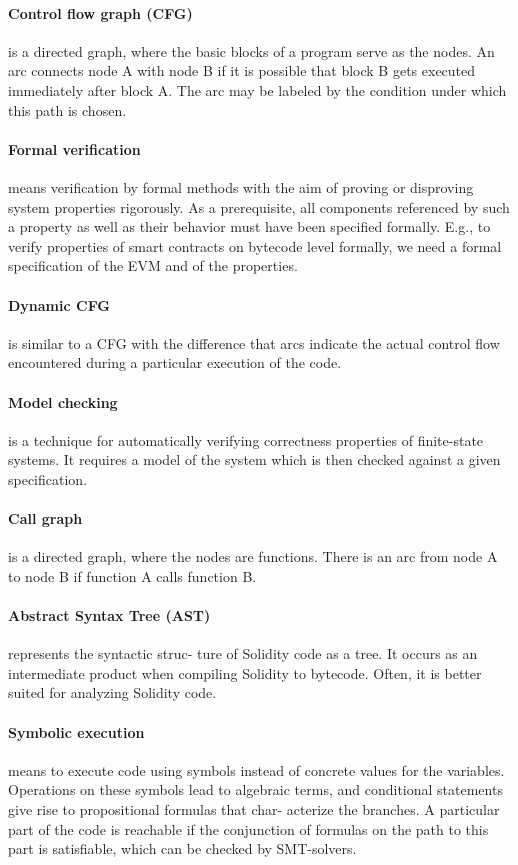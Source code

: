 \documentclass[a4paper,sigconf, language=french,
language=german, language=spanish, language=english]{acmart}
\begin{document}
\paragraph{Control ﬂow graph (CFG)} is a directed graph, where the
basic blocks of a program serve as the nodes. An arc
connects node A with node B if it is possible that block B
gets executed immediately after block A. The arc may be
labeled by the condition under which this path is chosen.
\paragraph{Formal veriﬁcation} means veriﬁcation by formal methods
with the aim of proving or disproving system properties
rigorously. As a prerequisite, all components referenced
by such a property as well as their behavior must have
been speciﬁed formally. E.g., to verify properties of smart
contracts on bytecode level formally, we need a formal
speciﬁcation of the EVM and of the properties.
\paragraph{Dynamic CFG} is similar to a CFG with the difference that
arcs indicate the actual control ﬂow encountered during a
particular execution of the code.
\paragraph{Model checking} is a technique for automatically verifying
correctness properties of ﬁnite-state systems. It requires a
model of the system which is then checked against a given
speciﬁcation.
\paragraph{Call graph} is a directed graph, where the nodes are
functions. There is an arc from node A to node B if
function A calls function B.
\paragraph{Abstract Syntax Tree (AST)}represents the syntactic struc-
ture of Solidity code as a tree. It occurs as an intermediate
product when compiling Solidity to bytecode. Often, it is
better suited for analyzing Solidity code.
\paragraph{Symbolic execution} means to execute code using symbols
instead of concrete values for the variables. Operations
on these symbols lead to algebraic terms, and conditional
statements give rise to propositional formulas that char-
acterize the branches. A particular part of the code is
reachable if the conjunction of formulas on the path to this
part is satisﬁable, which can be checked by SMT-solvers.
\end{document}
